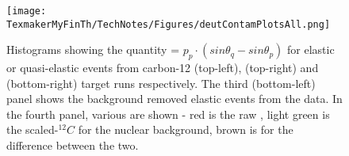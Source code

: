 \begin{figure}[H]%
\centerline{\texttt{[image: TexmakerMyFinTh/TechNotes/Figures/deutContamPlotsAll.png]}}
\caption[\Delt = $p_{p}\cdot(sin\theta_q - sin\theta_{p})$ for quasi-elastic events]{Histograms showing the quantity \Delt = $p_{p}\cdot(sin\theta_q - sin\theta_{p})$ for elastic or quasi-elastic events from carbon-12 (top-left),  (top-right) and  (bottom-right) target runs respectively. The third (bottom-left) panel shows the background removed elastic events from the  data. In the fourth panel, various \Delts are shown - red is the raw , light green is the scaled-$^{12}C$ for the nuclear background, brown is for the difference between the two.
}
\label{fig:deutContAll}
\end{figure}





